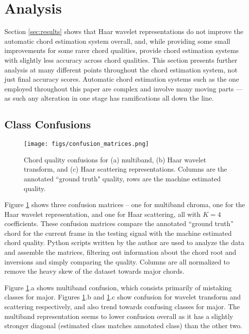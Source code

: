 
\section{Analysis}
\label{sec:analysis}

Section \ref{sec:results} shows that Haar wavelet representations do not improve the automatic chord estimation system overall, and, while providing some small improvements for some rarer chord qualities, provide chord estimation systems with slightly less accuracy across chord qualities. This section presents further analysis at many different points throughout the chord estimation system, not just final accuracy scores. Automatic chord estimation systems such as the one employed throughout this paper are complex and involve many moving parts --- as such any alteration in one stage has ramifications all down the line.

\subsection{Class Confusions}

\begin{figure}
\centering
\texttt{[image: figs/confusion\_matrices.png]}
\caption{Chord quality confusions for (a) multiband, (b) Haar wavelet transform, and (c) Haar scattering representations. Columns are the annotated ``ground truth" quality, rows are the machine estimated quality.}
\label{fig:confusion}
\end{figure}

Figure \ref{fig:confusion} shows three confusion matrices -- one for multiband chroma, one for the Haar wavelet representation, and one for Haar scattering, all with $K=4$ coefficients. These confusion matrices compare the annotated ``ground truth'' chord for the current frame in the testing signal with the machine estimated chord quality. Python scripts written by the author are used to analyze the data and assemble the matrices, filtering out information about the chord root and inversions and simply comparing the quality. Columns are all normalized to remove the heavy skew of the dataset towards major chords.

Figure \ref{fig:confusion}.a shows multiband confusion, which consists primarily of mistaking classes for major. Figures \ref{fig:confusion}.b and \ref{fig:confusion}.c show confusion for wavelet transform and scattering respectively, and also trend towards confusing classes for major. The multiband representation seems to lower confusion overall as it has a slightly stronger diagonal (estimated class matches annotated class) than the other two.

